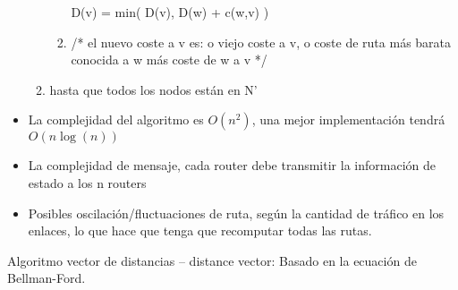 \documentclass[12pt, twoside, openright]{report} %
\begin{document}
\begin{itemize}
\begin{enumerate}
\begin{enumerate}
			                  D(v) = min( D(v), D(w) + c(w,v) )

			            \item /* el nuevo coste a v es: o viejo coste a v, o coste de ruta más barata conocida a w más coste de w a v */
		            \end{enumerate}
		      \item hasta que todos los nodos están en N'
	      \end{enumerate}

	\item La complejidad del algoritmo es \(O(n^2)\), una mejor
	      implementación tendrá \(O(n \log (n))\)
	\item La complejidad de mensaje, cada router debe transmitir la
	      información de estado a los n routers
	\item Posibles oscilación/fluctuaciones de ruta, según la cantidad de
	      tráfico en los enlaces, lo que hace que tenga que recomputar todas
	      las rutas.

\end{itemize}

Algoritmo vector de distancias -- distance vector: Basado en la
ecuación de Bellman-Ford.
\end{document}
